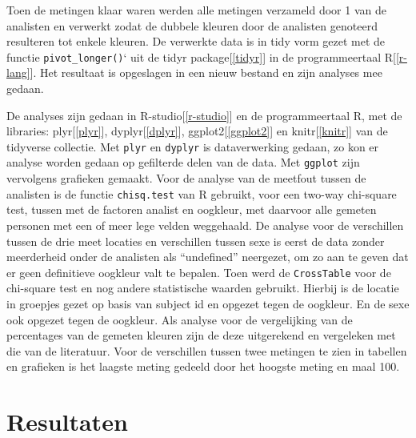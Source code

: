 \documentclass[
]{article}
\begin{document}
Toen de metingen klaar waren werden alle metingen verzameld door 1 van
de analisten en verwerkt zodat de dubbele kleuren door de analisten
genoteerd resulteren tot enkele kleuren. De verwerkte data is in tidy
vorm gezet met de functie \texttt{pivot\_longer()}` uit de tidyr
package{[}\ref{tidyr}{]} in de programmeertaal R{[}\ref{r-lang}{]}. Het
resultaat is opgeslagen in een nieuw bestand en zijn analyses mee
gedaan.

De analyses zijn gedaan in R-studio{[}\ref{r-studio}{]} en de
programmeertaal R, met de libraries: plyr{[}\ref{plyr}{]},
dyplyr{[}\ref{dplyr}{]}, ggplot2{[}\ref{ggplot2}{]} en knitr{[}\ref{knitr}{]} van
de tidyverse collectie. Met \texttt{plyr} en \texttt{dyplyr} is dataverwerking gedaan,
zo kon er analyse worden gedaan op gefilterde delen van de data. Met
\texttt{ggplot} zijn vervolgens grafieken gemaakt. Voor de analyse van de
meetfout tussen de analisten is de functie \texttt{chisq.test} van R gebruikt,
voor een two-way chi-square test, tussen met de factoren analist en
oogkleur, met daarvoor alle gemeten personen met een of meer lege velden
weggehaald. De analyse voor de verschillen tussen de drie meet locaties
en verschillen tussen sexe is eerst de data zonder meerderheid onder de
analisten als ``undefined'' neergezet, om zo aan te geven dat er geen
definitieve oogkleur valt te bepalen. Toen werd de \texttt{CrossTable} voor de
chi-square test en nog andere statistische waarden gebruikt. Hierbij is
de locatie in groepjes gezet op basis van subject id en opgezet tegen de
oogkleur. En de sexe ook opgezet tegen de oogkleur. Als analyse voor de
vergelijking van de percentages van de gemeten kleuren zijn de deze
uitgerekend en vergeleken met die van de literatuur. Voor de verschillen
tussen twee metingen te zien in tabellen en grafieken is het laagste
meting gedeeld door het hoogste meting en maal 100.

\hypertarget{resultaten}{%
\section{Resultaten}\label{resultaten}}
\end{document}
